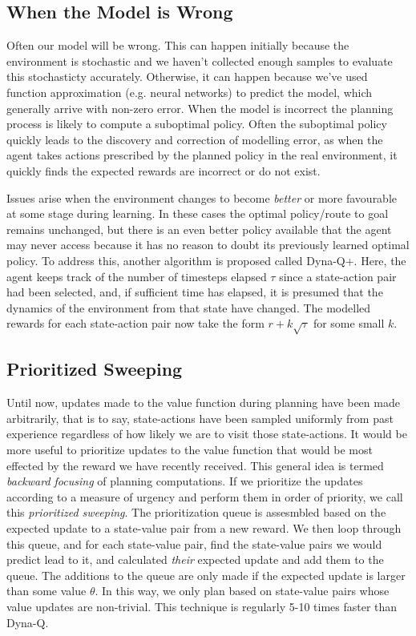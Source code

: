 \subsection{When the Model is Wrong}
Often our model will be wrong. This can happen initially because the environment is stochastic and we haven't collected enough samples to evaluate this stochasticty accurately. Otherwise, it can happen because we've used function approximation (e.g. neural networks) to predict the model, which generally arrive with non-zero error. When the model is incorrect the planning process is likely to compute a suboptimal policy. Often the suboptimal policy quickly leads to the discovery and correction of modelling error, as when the agent takes actions prescribed by the planned policy in the real environment, it quickly finds the expected rewards are incorrect or do not exist. 

Issues arise when the environment changes to become \textit{better} or more favourable at some stage during learning. In these cases the optimal policy/route to goal remains unchanged, but there is an even better policy available that the agent may never access because it has no reason to doubt its previously learned optimal policy. To address this, another algorithm is proposed called Dyna-Q+. Here, the agent keeps track of the number of timesteps elapsed $\tau$ since a state-action pair had been selected, and, if sufficient time has elapsed, it is presumed that the dynamics of the environment from that state have changed. The modelled rewards for each state-action pair now take the form $r + k\sqrt{\tau}$ for some small $k$.

\subsection{Prioritized Sweeping}
Until now, updates made to the value function during planning have been made arbitrarily, that is to say, state-actions have been sampled uniformly from past experience regardless of how likely we are to visit those state-actions. It would be more useful to prioritize updates to the value function that would be most effected by the reward we have recently received. This general idea is termed \textit{backward focusing} of planning computations. If we prioritize the updates according to a measure of urgency and perform them in order of priority, we call this \textit{prioritized sweeping}. The prioritization queue is assesmbled based on the expected update to a state-value pair from a new reward. We then loop through this queue, and for each state-value pair, find the state-value pairs we would predict lead to it, and calculated \textit{their} expected update and add them to the queue. The additions to the queue are only made if the expected update is larger than some value $\theta$. In this way, we only plan based on state-value pairs whose value updates are non-trivial. This technique is regularly 5-10 times faster than Dyna-Q.

